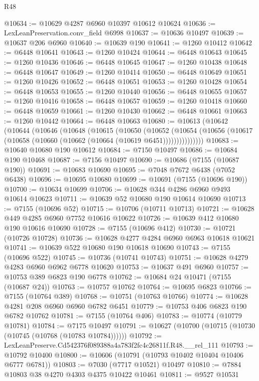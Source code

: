 \begin{lexlean}{R48}
\begin{coremodule}
@10634 := @10629 @4287 @6960 @10397 @10612 @10624
@10636 := LexLeanPreservation.conv_field @6998
@10637 := @10636 @10497
@10639 := @10637 @206 @6960
@10640 := @10639 @190
@10641 := @1260 @10412
@10642 := @6448 @10641
@10643 := @1260 @10424
@10644 := @6448 @10643
@10645 := @1260 @10436
@10646 := @6448 @10645
@10647 := @1260 @10438
@10648 := @6448 @10647
@10649 := @1260 @10414
@10650 := @6448 @10649
@10651 := @1260 @10426
@10652 := @6448 @10651
@10653 := @1260 @10428
@10654 := @6448 @10653
@10655 := @1260 @10440
@10656 := @6448 @10655
@10657 := @1260 @10416
@10658 := @6448 @10657
@10659 := @1260 @10418
@10660 := @6448 @10659
@10661 := @1260 @10430
@10662 := @6448 @10661
@10663 := @1260 @10442
@10664 := @6448 @10663
@10680 := @10613
    (@10642
      (@10644
        (@10646
          (@10648
            (@10615
              (@10650
                (@10652
                  (@10654
                    (@10656 (@10617 (@10658 (@10660 (@10662 (@10664 (@10619 @6451)))))))))))))))
@10683 := @10640 @10680 @190 @10612
@10684 := @7150 @10497
@10686 := @10684 @190 @10468
@10687 := @7156 @10497
@10690 := @10686 (@7155 (@10687 @190))
@10691 := @10683 @10690
@10695 := @7048 @7672 @6438 (@7052 @6438)
@10696 := @10695 @10680
@10699 := @10691 (@7155 (@10696 @190))
@10700 := @10634 @10699
@10706 := @10628 @344 @4286 @6960 @9493 @10614 @10623
@10711 := @10639 @52 @10680 @190 @10614 @10690
@10713 := @7155 (@10696 @52)
@10715 := @10706 (@10711 @10713)
@10721 := @10628 @449 @4285 @6960 @7752 @10616 @10622
@10726 := @10639 @412 @10680 @190 @10616 @10690
@10728 := @7155 (@10696 @412)
@10730 := @10721 (@10726 @10728)
@10736 := @10628 @4277 @4284 @6960 @6963 @10618 @10621
@10741 := @10639 @522 @10680 @190 @10618 @10690
@10743 := @7155 (@10696 @522)
@10745 := @10736 (@10741 @10743)
@10751 := @10628 @4279 @4283 @6960 @6962 @6778 @10620
@10753 := @10637 @491 @6960
@10757 := @10753 @389 @6823 @190 @6778
@10762 := @10684 @24 @10471 (@7155 (@10687 @24))
@10763 := @10757 @10762
@10764 := @10695 @6823
@10766 := @7155 (@10764 @389)
@10768 := @10751 (@10763 @10766)
@10774 := @10628 @4281 @208 @6960 @6960 @6782 @6451
@10779 := @10753 @406 @6823 @190 @6782 @10762
@10781 := @7155 (@10764 @406)
@10783 := @10774 (@10779 @10781)
@10784 := @7175 @10497
@10791 := @10627 (@10700 (@10715 (@10730 (@10745 (@10768 (@10783 @10784))))))
@10792 := LexLeanPreserve.Cd542376f089388a4a783f2fc4c26811f.R48.__rel_111
@10793 := @10792 @10400
@10800 := @10606 (@10791 (@10793 @10402 @10404 @10406 @6777 @6781))
@10803 := @7030 (@7717 @10521) @10497
@10810 := @7884 @10803 @38 @4270 @4303 @4375 @10422 @10461
@10811 := @9527 @10531

\end{coremodule}
\end{lexlean}
